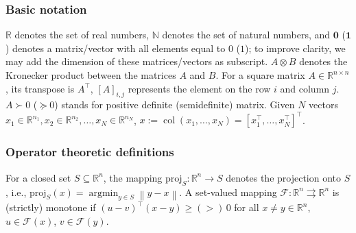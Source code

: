 \documentclass{IEEEtran}  %
\newcommand{\bs}{\boldsymbol}
\newcommand{\mc}{\mathcal}
\newcommand{\bb}{\mathbb}
\newcommand{\R}{\bb R}
\newcommand{\argmin}{\operatorname{argmin}}
\newcommand{\fix}{\mathrm{fix}}
\newcommand{\proj}{\mathrm{proj}}
\newcommand{\Id}{\mathrm{Id}}
\newcommand{\col}{\operatorname{col}}
\newcommand{\zer}{\operatorname{zer}}
\newcommand{\nc}{\mathrm{N}}
\newcommand{\0}{\mathbf{0}}
\newcommand{\1}{\mathbf{1}}
\newcommand{\edit}[1]{\color{blue}{#1}\color{black}}
\newcommand{\note}[1]{\textcolor{blue}{\texttt{#1}}}
\begin{document}
\smallskip
\subsubsection*{Basic notation}
$\R$ denotes the set of real numbers, $\bb N$ denotes the set of natural numbers, and  $\bs{0}$ ($\bs{1}$) denotes a matrix/vector with all elements equal to $0$ ($1$); to improve clarity, we may add the dimension of these matrices/vectors as subscript. $A \otimes B$ denotes the Kronecker product between the matrices $A$ and $B$. For a square matrix $A \in \R^{n \times n}$, its transpose is $A^\top$, $[A]_{i,j}$ represents the element on the row $i$ and column $j$. $A \succ 0$ ($\succcurlyeq 0$) stands for positive definite (semidefinite) matrix. Given $N$ vectors $x_1 \in \bb R^{n_1}, x_2 \in \bb R^{n_2},\ldots, x_N \in \R^{n_N}$, $x := \col\left(x_1,\ldots,x_N\right) = [ x_1^\top, \ldots , x_N^\top ]^\top$. \marginnote{\note{R4-9}}\edit{Given $x \in \bb R^n$, $\|x\|_A^2 = x^\top A x,$ with square matrix $A \succ 0$.}

\smallskip
\subsubsection*{Operator theoretic definitions}
For a closed set $S \subseteq \R^n$, the mapping $\proj_{S}:\R^n \rightarrow S$ denotes the projection onto $S$, i.e., $\proj_{S}(x) = \argmin_{y \in S} \left\| y - x\right\|$. 
A set-valued mapping $\mathcal{F} : \R^n \rightrightarrows \R^n$ is (strictly) monotone if $(u-v)^\top  (x-y) \geq (>) \, 0$ for all $x \neq y \in \R^n$, $u \in \mathcal{F} (x)$, $v \in \mathcal{F} (y)$.

\end{document}
